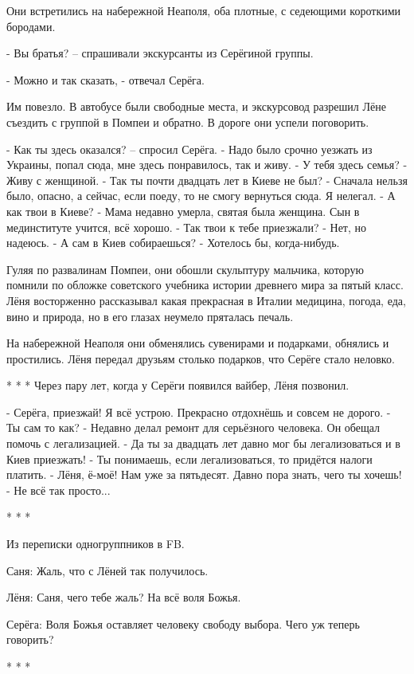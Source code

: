 Они встретились на набережной Неаполя, оба плотные, с седеющими короткими
бородами.

- Вы братья? – спрашивали экскурсанты из Серёгиной группы.

- Можно и так сказать, - отвечал Серёга.

Им повезло. В автобусе были свободные места, и экскурсовод разрешил Лёне
съездить с группой в Помпеи и обратно. В дороге они успели поговорить.

\obeycr
- Как ты здесь оказался? – спросил Серёга.
- Надо было срочно уезжать из Украины, попал сюда, мне здесь понравилось, так и живу.
- У тебя здесь семья?
- Живу с женщиной.
- Так ты почти двадцать лет в Киеве не был?
- Сначала нельзя было, опасно, а сейчас, если поеду, то не смогу вернуться сюда. Я нелегал.
- А как твои в Киеве?
- Мама недавно умерла, святая была женщина. Сын в мединституте учится, всё хорошо.
- Так твои к тебе приезжали?
- Нет, но надеюсь.
- А сам в Киев собираешься?
- Хотелось бы, когда-нибудь.
\restorecr

Гуляя по развалинам Помпеи, они обошли скульптуру мальчика, которую помнили по
обложке советского учебника истории древнего мира за пятый класс. Лёня
восторженно рассказывал какая прекрасная в Италии медицина, погода, еда, вино и
природа, но в его глазах неумело пряталась печаль.

На набережной Неаполя они обменялись сувенирами и подарками, обнялись и
простились. Лёня передал друзьям столько подарков, что Серёге стало неловко.

* * *
Через пару лет, когда у Серёги появился вайбер, Лёня позвонил.

\obeycr
- Серёга, приезжай! Я всё устрою. Прекрасно отдохнёшь и совсем не дорого.
- Ты сам то как?
- Недавно делал ремонт для серьёзного человека. Он обещал помочь с легализацией.
- Да ты за двадцать лет давно мог бы легализоваться и в Киев приезжать!
- Ты понимаешь, если легализоваться, то придётся налоги платить.
- Лёня, ё-моё!  Нам уже за пятьдесят. Давно пора знать, чего ты хочешь!
- Не всё так просто...
\restorecr

* * *

Из переписки одногруппников в FB.

Саня: Жаль, что с Лёней так получилось.

Лёня: Саня, чего тебе жаль? На всё воля Божья.

Серёга: Воля Божья оставляет человеку свободу выбора. Чего уж теперь говорить?

* * *


